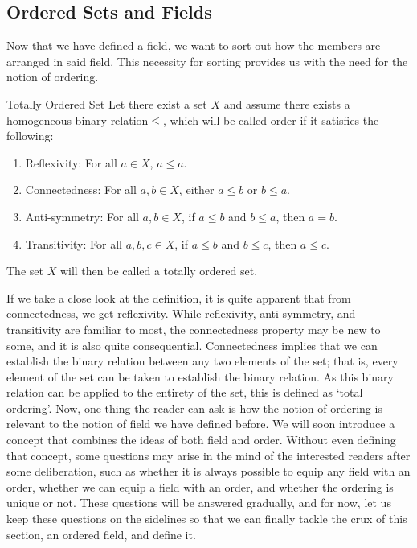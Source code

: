 \subsection{Ordered Sets and Fields}
Now that we have defined a field, we want to sort out how the members are arranged in said field. This necessity for sorting provides us with the need for the notion of ordering.
\begin{Definition}{Totally Ordered Set}\label{totally_ordered_set}
    Let there exist a set $X$ and assume there exists a homogeneous binary relation\footnotemark $\leq$, which will be called order if it satisfies the following:
    \begin{enumerate}
        \item Reflexivity: For all $a\in X$, $a\leq a$.
        \item Connectedness: For all $a,b\in X$, either $a\leq b$ or $b\leq a$.
        \item Anti-symmetry: For all $a,b\in X$, if $a\leq b$ and $b\leq a$, then $a=b$.
        \item Transitivity: For all $a,b,c\in X$, if $a\leq b$ and $b\leq c$, then $a\leq c$.
    \end{enumerate}
    The set $X$ will then be called a totally ordered set.
\end{Definition}
\noindent If we take a close look at the definition, it is quite apparent that from connectedness, we get reflexivity. While reflexivity, anti-symmetry, and transitivity are familiar to most, the connectedness property may be new to some, and it is also quite consequential. Connectedness implies that we can establish the binary relation between any two elements of the set; that is, every element of the set can be taken to establish the binary relation. As this binary relation can be applied to the entirety of the set, this is defined as `total ordering'.
\noindent Now, one thing the reader can ask is how the notion of ordering is relevant to the notion of field we have defined before. We will soon introduce a concept that combines the ideas of both field and order. Without even defining that concept, some questions may arise in the mind of the interested readers after some deliberation, such as whether it is always possible to equip any field with an order, whether we can equip a field with an order, and whether the ordering is unique or not. These questions will be answered gradually, and for now, let us keep these questions on the sidelines so that we can finally tackle the crux of this section, an ordered field, and define it.
